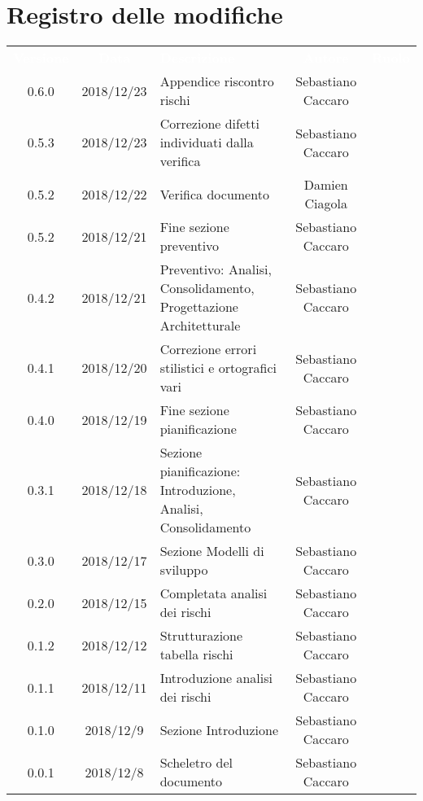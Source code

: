 
\section*{Registro delle modifiche}
{
	\renewcommand{\arraystretch}{1.5}
	\centering
	\begin{longtable}{ c c  C{4cm}  c  c }
		
		\textcolor{white}{\textbf{Versione}} & \textcolor{white}{\textbf{Data}} & \textcolor{white}{\textbf{Descrizione}} & \textcolor{white}{\textbf{Autore}} & \textcolor{white}{\textbf{Ruolo}}\\
		
		0.6.0 & 2018/12/23 & Appendice riscontro rischi & Sebastiano Caccaro & \Res{}\\
					
		0.5.3 & 2018/12/23 & Correzione difetti individuati dalla verifica & Sebastiano Caccaro & \Res{}\\		
		
		0.5.2 & 2018/12/22 & Verifica documento & Damien Ciagola & \ver{}\\
		
		0.5.2 & 2018/12/21 & Fine sezione preventivo & Sebastiano Caccaro & \Res{}\\
		
		0.4.2 & 2018/12/21 & Preventivo: Analisi, Consolidamento, Progettazione Architetturale & Sebastiano Caccaro & \Res{}\\
		
		0.4.1 & 2018/12/20 & Correzione errori stilistici e ortografici vari & Sebastiano Caccaro & \Res{}\\
		
		0.4.0 & 2018/12/19 & Fine sezione pianificazione & Sebastiano Caccaro & \Res{}\\
		
		0.3.1 & 2018/12/18 & Sezione pianificazione: Introduzione, Analisi, Consolidamento & Sebastiano Caccaro & \Res{}\\
		
		0.3.0 & 2018/12/17 & Sezione Modelli di sviluppo & Sebastiano Caccaro & \Res{}\\
				
		0.2.0 & 2018/12/15 & Completata analisi dei rischi & Sebastiano Caccaro & \Res{}\\
				
		0.1.2 & 2018/12/12 & Strutturazione tabella rischi & Sebastiano Caccaro & \Res{}\\
				
		0.1.1 & 2018/12/11 & Introduzione analisi dei rischi & Sebastiano Caccaro & \Res{}\\
				
		0.1.0 & 2018/12/9 & Sezione Introduzione & Sebastiano Caccaro & \Res{}\\
		
		0.0.1 & 2018/12/8 & Scheletro del documento & Sebastiano Caccaro & \Res{}\\
		
	\end{longtable}

}